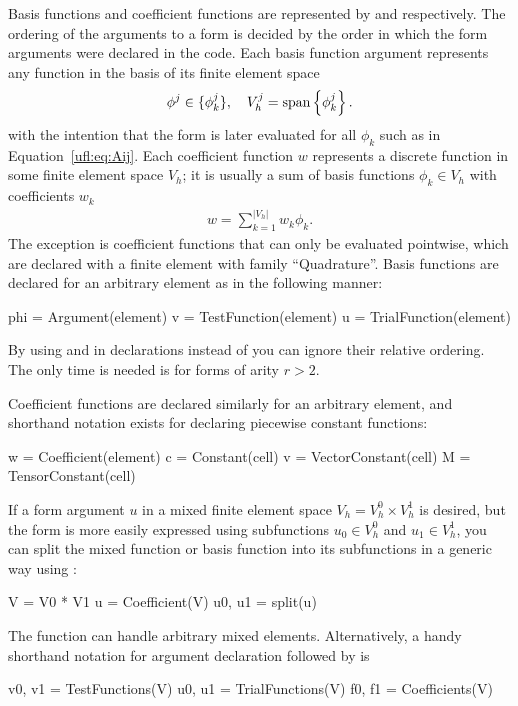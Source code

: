 Basis functions and coefficient functions are represented by
 and  respectively. The ordering
of the arguments to a form is decided by the order in which the form
arguments were declared in the \ufl{} code.  Each basis function
argument represents any function in the basis of its finite element
space
\begin{align}
  \phi^j \in \{\phi_k^j\}, \quad V_h^j = \operatorname{span}\left\{ \phi_k^j \right\}.
\end{align}
with the intention that the form is later evaluated for all $\phi_k$
such as in Equation~\eqref{ufl:eq:Aij}.  Each coefficient function $w$
represents a discrete function in some finite element space $V_h$; it
is usually a sum of basis functions $\phi_k \in V_h$ with coefficients
$w_k$
\begin{align}
w = \sum_{k=1}^{|V_h|} w_k \phi_k.
\end{align}
The exception is coefficient functions that can only be evaluated
pointwise, which are declared with a finite element with family
``Quadrature''.  Basis functions are declared for an arbitrary element
as in the following manner:
\begin{python}
phi = Argument(element)
v = TestFunction(element)
u = TrialFunction(element)
\end{python}
By using  and  in
declarations instead of  you can ignore their
relative ordering.  The only time  is needed is
for forms of arity $r > 2$.

Coefficient functions are declared similarly for an arbitrary element,
and shorthand notation exists for declaring piecewise constant
functions:
\begin{python}
w = Coefficient(element)
c = Constant(cell)
v = VectorConstant(cell)
M = TensorConstant(cell)
\end{python}
If a form argument $u$ in a mixed finite element space $V_h = V_h^0
\times V_h^1$ is desired, but the form is more easily expressed using
subfunctions $u_0 \in V_h^0$ and $u_1 \in V_h^1$, you can split the
mixed function or basis function into its subfunctions in a generic
way using :
\begin{python}
V = V0 * V1
u = Coefficient(V)
u0, u1 = split(u)
\end{python}
The  function can handle arbitrary mixed elements.
Alternatively, a handy shorthand notation for argument declaration
followed by  is
\begin{python}
v0, v1 = TestFunctions(V)
u0, u1 = TrialFunctions(V)
f0, f1 = Coefficients(V)
\end{python}


